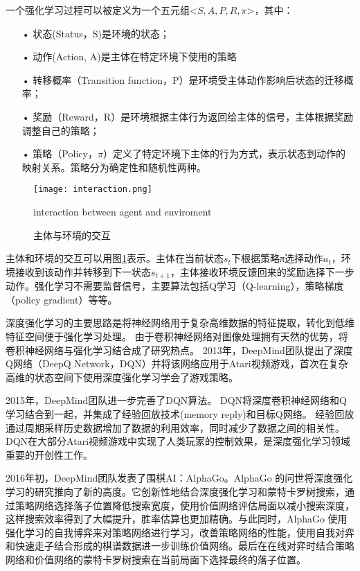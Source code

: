 一个强化学习过程可以被定义为一个五元组<$S, A, P, R, \pi$>，其中：
\begin{itemize}
  \item[•] 状态(Status，S)是环境的状态；
  \item[•] 动作(Action, A)是主体在特定环境下使用的策略
  \item[•] 转移概率（Transition function，P）是环境受主体动作影响后状态的迁移概率；
  \item[•] 奖励（Reward，R）是环境根据主体行为返回给主体的信号，主体根据奖励调整自己的策略；
  \item[•] 策略（Policy，$\pi$）定义了特定环境下主体的行为方式，表示状态到动作的映射关系。策略分为确定性和随机性两种。
\end{itemize}

\begin{figure}[!htbp]\centering
  \texttt{[image: interaction.png]}
  \caption{主体与环境的交互}{interaction between agent and enviroment}
  \label{fig:interaction}       %
\end{figure}

主体和环境的交互可以用图\ref{fig:interaction}表示。主体在当前状态$s_t$下根据策略π选择动作$a_t$，环境接收到该动作并转移到下一状态$s_{t+1}$，主体接收环境反馈回来的奖励选择下一步动作。强化学习不需要监督信号，主要算法包括Q学习（Q-learning），策略梯度（policy gradient）等等。

深度强化学习的主要思路是将神经网络用于复杂高维数据的特征提取，转化到低维特征空间便于强化学习处理。
由于卷积神经网络对图像处理拥有天然的优势，将卷积神经网络与强化学习结合成了研究热点。
2013年，DeepMind团队提出了深度Q网络（DeepQ Network，DQN）\cite{Mnih2013PlayingAW}并将该网络应用于Atari视频游戏，首次在复杂高维的状态空间下使用深度强化学习学会了游戏策略。

2015年，DeepMind团队进一步完善了DQN算法\cite{Mnih2015HumanlevelCT}。
DQN将深度卷积神经网络和Q学习结合到一起，并集成了经验回放技术(memory reply)和目标Q网络。
经验回放通过周期采样历史数据增加了数据的利用效率，同时减少了数据之间的相关性。
DQN在大部分Atari视频游戏中实现了人类玩家的控制效果，是深度强化学习领域重要的开创性工作。

2016年初，DeepMind团队发表了围棋AI：AlphaGo\cite{Silver2016MasteringTG}。AlphaGo 的问世将深度强化学习的研究推向了新的高度。它创新性地结合深度强化学习和蒙特卡罗树搜索，通过策略网络选择落子位置降低搜索宽度，使用价值网络评估局面以减小搜索深度，这样搜索效率得到了大幅提升，胜率估算也更加精确。与此同时，AlphaGo 使用强化学习的自我博弈来对策略网络进行学习，改善策略网络的性能，使用自我对弈和快速走子结合形成的棋谱数据进一步训练价值网络。最后在在线对弈时结合策略网络和价值网络的蒙特卡罗树搜索在当前局面下选择最终的落子位置。

